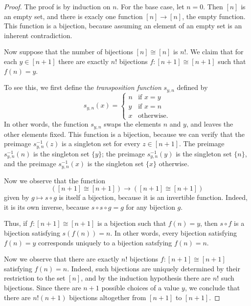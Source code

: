 \begin{proof}
  The proof is by induction on $n$. For the base case, let $n=0$. Then $[n]$ is an empty set, and there is exacly one function $[n]\to [n]$, the empty function. This function is a bijection, because assuming an element of an empty set is an inherent contradiction.

  Now suppose that the number of bijections $[n]\cong[n]$ is $n!$. We claim that for each $y\in[n+1]$ there are exactly $n!$ bijections $f:[n+1]\cong[n+1]$ such that $f(n)=y$.

  To see this, we first define the \emph{transposition function} $s_{y,n}$ defined by
  \begin{equation*}
    s_{y,n}(x) =
    \begin{cases}
      n & \text{if }x=y \\
      y & \text{if }x=n \\
      x & \text{otherwise.}
    \end{cases}
  \end{equation*}
  In other words, the function $s_{y,n}$ swaps the elements $n$ and $y$, and leaves the other elements fixed. This function is a bijection, because we can verify that the preimage $s_{y,n}^{-1}(z)$ is a singleton set for every $z\in[n+1]$. The preimage $s_{y,n}^{-1}(n)$ is the singleton set $\{y\}$; the preimage $s_{y,n}^{-1}(y)$ is the singleton set $\{n\}$, and the preimage $s_{y,n}^{-1}(x)$ is the singleton set $\{x\}$ otherwise.

  Now we observe that the function
  \begin{equation*}
    ([n+1]\cong[n+1])\to ([n+1]\cong[n+1])
  \end{equation*}
  given by $g\mapsto s\circ g$ is itself a bijection, because it is an invertible function. Indeed, it is its own inverse, because $s\circ s\circ g = g$ for any bijection $g$.

  Thus, if $f:[n+1]\cong[n+1]$ is a bijection such that $f(n)=y$, then $s\circ f$ is a bijection satisfying $s(f(n))=n$. In other words, every bijection satisfying $f(n)=y$ corresponds uniquely to a bijection satsfying $f(n)=n$.

  Now we observe that there are exactly $n!$ bijections $f:[n+1]\cong[n+1]$ satisfying $f(n)=n$. Indeed, such bijections are uniquely determined by their restriction to the set $[n]$, and by the induction hypothesis there are $n!$ such bijections. Since there are $n+1$ possible choices of a value $y$, we conclude that there are $n!(n+1)$ bijections altogether from $[n+1]$ to $[n+1]$.
\end{proof}

